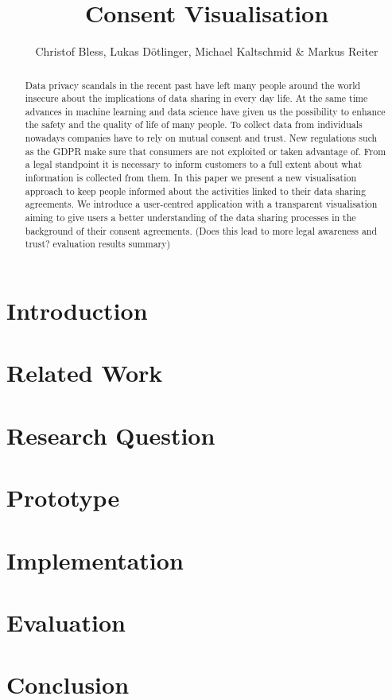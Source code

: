 \documentclass[notitlepage,11pt]{article}
\begin{document}
\title{Consent Visualisation}
\author{Christof Bless, Lukas Dötlinger, Michael Kaltschmid \& Markus Reiter}
\maketitle
\begin{abstract}
  Data privacy scandals in the recent past have left many people around the world
  insecure about the implications of data sharing in every day life.  At the
  same time advances in machine learning and data science have given us the
  possibility to enhance the safety and the quality of life of many people.  To
  collect data from individuals nowadays companies have to rely on mutual
  consent and trust. New regulations such as the GDPR make sure that consumers
  are not exploited or taken advantage of.  From a legal standpoint it is
  necessary to inform customers to a full extent about what information is
  collected from them.  In this paper we present a new visualisation approach
  to keep people informed about the activities linked to their data sharing
  agreements. We introduce a user-centred application with a transparent
  visualisation aiming to give users a better understanding of the data sharing
  processes in the background of their consent agreements.  (Does this lead to
  more legal awareness and trust? evaluation results summary)
\end{abstract}

\section{Introduction}
\label{sec:introduction}


\section{Related Work}
\label{sec:related_work}


\section{Research Question}
\label{sec:research_question}


\section{Prototype}
\label{sec:prototyping}


\section{Implementation}
\label{sec:implementation}


\section{Evaluation}
\label{sec:evaluation}


\section{Conclusion}
\label{sec:conclusion}


\newpage
\printbibliography
\end{document}
